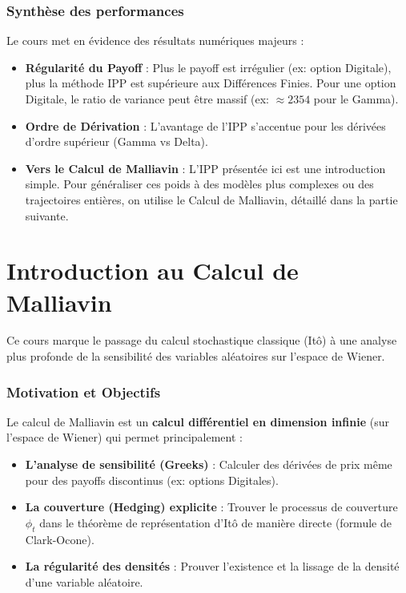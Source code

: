 \documentclass{article}
\begin{document}
\section{Synthèse des performances}
Le cours met en évidence des résultats numériques majeurs :
\begin{itemize}
    \item \textbf{Régularité du Payoff} : Plus le payoff est irrégulier (ex: option Digitale), plus la méthode IPP est supérieure aux Différences Finies. Pour une option Digitale, le ratio de variance peut être massif (ex: $\approx 2354$ pour le Gamma).
    \item \textbf{Ordre de Dérivation} : L'avantage de l'IPP s'accentue pour les dérivées d'ordre supérieur (Gamma vs Delta).
    \item \textbf{Vers le Calcul de Malliavin} : L'IPP présentée ici est une introduction simple. Pour généraliser ces poids à des modèles plus complexes ou des trajectoires entières, on utilise le Calcul de Malliavin, détaillé dans la partie suivante.
\end{itemize}

\part{Introduction au Calcul de Malliavin}
Ce cours marque le passage du calcul stochastique classique (Itô) à une analyse plus profonde de la sensibilité des variables aléatoires sur l'espace de Wiener.

\section{Motivation et Objectifs}
Le calcul de Malliavin est un \textbf{calcul différentiel en dimension infinie} (sur l'espace de Wiener) qui permet principalement :
\begin{itemize}
    \item \textbf{L'analyse de sensibilité (Greeks)} : Calculer des dérivées de prix même pour des payoffs discontinus (ex: options Digitales).
    \item \textbf{La couverture (Hedging) explicite} : Trouver le processus de couverture $\phi_t$ dans le théorème de représentation d'Itô de manière directe (formule de Clark-Ocone).
    \item \textbf{La régularité des densités} : Prouver l'existence et la lissage de la densité d'une variable aléatoire.
\end{itemize}
\end{document}
